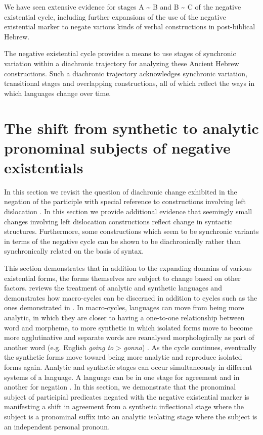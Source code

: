 ﻿\documentclass[output=paper]{langsci/langscibook}
\begin{document}
We have seen extensive evidence for stages A {\textasciitilde} B and B {\textasciitilde} C of the negative existential cycle, including further expansions of the use of the negative existential marker to negate various kinds of verbal constructions in post-biblical Hebrew. 

The negative existential cycle provides a means to use stages of synchronic variation within a diachronic trajectory for analyzing these Ancient Hebrew constructions. Such a diachronic trajectory acknowledges synchronic variation, transitional stages and overlapping constructions, all of which reflect the ways in which languages change over time.

\section{The shift from synthetic to analytic pronominal subjects of
negative existentials}\label{sec:Hebrew-4}

In this section we revisit the question of diachronic change exhibited in
the negation of the participle with special reference to constructions
involving left dislocation \parencite[see][]{NaudeMiller2016}. In
this section we provide additional evidence that seemingly small changes
involving left dislocation constructions reflect change in syntactic
structures. Furthermore, some constructions which seem to be synchronic
variants in terms of the negative cycle can be shown to be diachronically
rather than synchronically related on the basis of syntax.

This section demonstrates that in addition to the expanding domains of
various existential forms, the forms themselves are subject to change based
on other factors. \Textcite[7]{Gelderen2016} reviews the treatment of
analytic and synthetic languages and demonstrates how macro-cycles can be
discerned in addition to cycles such as the ones demonstrated in
. In macro-cycles, languages can move from being more
analytic, in which they are closer to having a one-to-one relationship
between word and morpheme, to more synthetic in which isolated forms move
to become more agglutinative and separate words are reanalysed
morphologically as part of another word (e.g. English \textit{going
to} > \textit{gonna})  \parencite[see][6--8 for a
description of the development of this notion]{Gelderen2016}. As the cycle continues,
eventually the synthetic forms move toward being more analytic and
reproduce isolated forms again. Analytic and synthetic stages can occur
simultaneously in different systems of a language. A language can be in one
stage for agreement and in another for negation 
\parencite[7]{Gelderen2016}. In this section, we demonstrate that the
pronominal subject of participial predicates negated with the negative
existential marker is manifesting a shift in agreement from a synthetic
inflectional stage where the subject is a pronominal suffix into an
analytic isolating stage where the subject is an independent personal
pronoun. 
\end{document}
